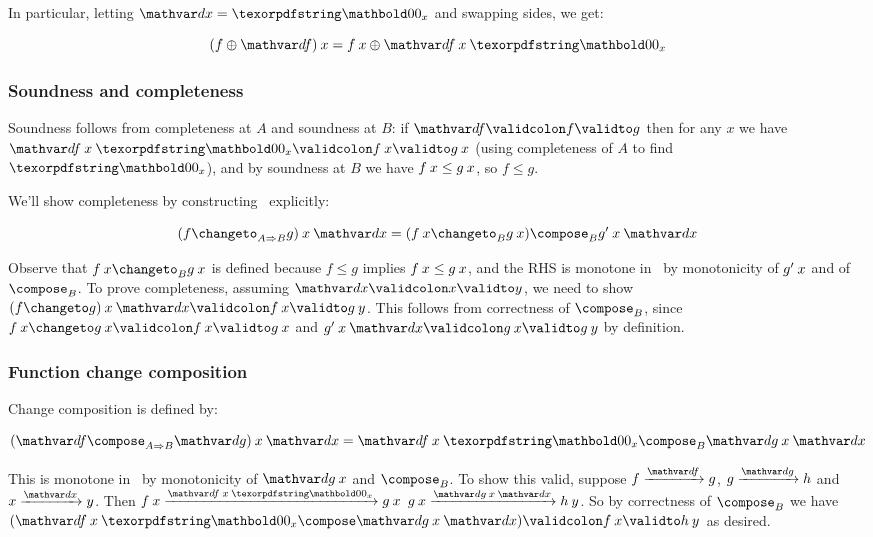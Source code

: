 \noindent In particular, letting $\dx = \zero_x$ and swapping sides, we get:

\nopagebreak[2]
\[ (f \upd \df) \<x = f\<x \upd \df\<x\<\zero_x \]

\noindent
{}

\subsubsection{Soundness and completeness}

Soundness follows from completeness at $A$ and soundness at $B$: if $\valid\df f
g$ then for any $x$ we have $\valid{\df\<x\<\zero_x}{f\<x}{g\<x}$ (using
completeness of $A$ to find $\zero_x$), and by soundness at $B$ we have $f\<x
\le g\<x$, so $f \le g$.

We'll show completeness by constructing \changetofn\ explicitly:

\nopagebreak[2]
\[ (f \changeto_{\expO A B} g) \<x \<\dx = (f\<x \changeto_B g\<x) \compose_B \deriv g\<x\<\dx\]

\noindent Observe that $f\<x \changeto_B g\<x$ is defined because $f \le g$
implies $f\<x \le g\<x$, and the RHS is monotone in \dx\ by monotonicity of
$\deriv g \<x$ and of $\composefn_B$.
%
To prove completeness, assuming $\valid\dx x y$, we need to show \( \valid{(f
  \changeto g) \<x \<\dx}{f\<x}{g\<y} \). This follows from correctness of
$\composefn_B$, since \( \valid{f\<x \changeto g\<x}{f\<x}{g\<x} \) and
\(\valid{\deriv g \<x \<\dx}{g\<x}{g\<y}\) by definition.

\subsubsection{Function change composition}

Change composition is defined by:

\nopagebreak[2]
\[ (\df \compose_{\expO A B} \dg) \<x \<\dx = \df \<x \<\zero_x \compose_B \dg \<x \<\dx\]

\noindent
This is monotone in \dx\ by monotonicity of $\dg\<x$ and $\composefn_B$. To show
this valid, suppose $\vld\df f g$, $\vld\dg g h$ and $\vld\dx x y$. Then
%
\(\vld{\df\<x\<\zero_x}{f\<x}{g\<x}\)
\(\vld{\dg\<x\<\dx}{g\<x}{h\<y} \).
%
\noindent So by correctness of $\composefn_B$ we have \(\valid{(\df\<x\<\zero_x
  \compose \dg\<x\<\dx)}{f\<x}{h\<y}\) as desired.

